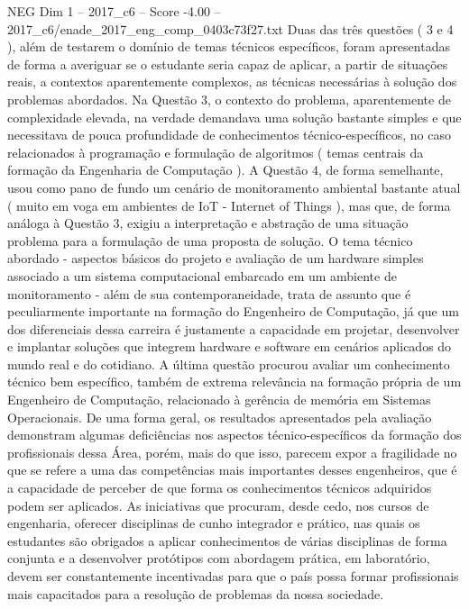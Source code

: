 \begin{textsample}{NEG Dim 1 – 2017\_c6 – Score -4.00 – 2017\_c6/enade\_2017\_eng\_comp\_0403c73f27.txt}
Duas das três questões ( 3 e 4 ), além de testarem o domínio de temas técnicos específicos, foram apresentadas de forma a averiguar se o estudante seria capaz de aplicar, a partir de situações reais, a contextos aparentemente complexos, as técnicas necessárias à solução dos problemas abordados.
Na Questão 3, o contexto do problema, aparentemente de complexidade elevada, na verdade demandava uma solução bastante simples e que necessitava de pouca profundidade de conhecimentos técnico-específicos, no caso relacionados à programação e formulação de algoritmos ( temas centrais da formação da Engenharia de Computação ).
A Questão 4, de forma semelhante, usou como pano de fundo um cenário de monitoramento ambiental bastante atual ( muito em voga em ambientes de IoT - Internet of Things ), mas que, de forma análoga à Questão 3, exigiu a interpretação e abstração de uma situação problema para a formulação de uma proposta de solução.
O tema técnico abordado - aspectos básicos do projeto e avaliação de um hardware simples associado a um sistema computacional embarcado em um ambiente de monitoramento - além de sua contemporaneidade, trata de assunto que é peculiarmente importante na formação do Engenheiro de Computação, já que um dos diferenciais dessa carreira é justamente a capacidade em projetar, desenvolver e implantar soluções que integrem hardware e software em cenários aplicados do mundo real e do cotidiano.
A última questão procurou avaliar um conhecimento técnico bem específico, também de extrema relevância na formação própria de um Engenheiro de Computação, relacionado à gerência de memória em Sistemas Operacionais.
De uma forma geral, os resultados apresentados pela avaliação demonstram algumas deficiências nos aspectos técnico-específicos da formação dos profissionais dessa Área, porém, mais do que isso, parecem expor a fragilidade no que se refere a uma das competências mais importantes desses engenheiros, que é a capacidade de perceber de que forma os conhecimentos técnicos adquiridos podem ser aplicados.
As iniciativas que procuram, desde cedo, nos cursos de engenharia, oferecer disciplinas de cunho integrador e prático, nas quais os estudantes são obrigados a aplicar conhecimentos de várias disciplinas de forma conjunta e a desenvolver protótipos com abordagem prática, em laboratório, devem ser constantemente incentivadas para que o país possa formar profissionais mais capacitados para a resolução de problemas da nossa sociedade.

\end{textsample}
